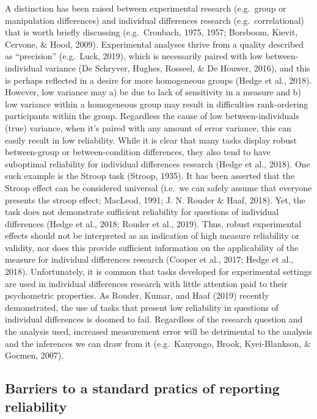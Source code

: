 \documentclass[english,,man,floatsintext]{apa6}
\begin{document}
A distinction has been raised between experimental research (e.g.~group or manipulation differences) and individual differences research (e.g.~correlational) that is worth briefly discussing (e.g.~Cronbach, 1975, 1957; Borsboom, Kievit, Cervone, \& Hood, 2009). Experimental analyses thrive from a quality described as \enquote{precision} (e.g.~Luck, 2019), which is necessarily paired with low between-individual variance (De Schryver, Hughes, Rosseel, \& De Houwer, 2016), and this is perhaps reflected in a desire for more homogeneous groups (Hedge et al., 2018). However, low variance may a) be due to lack of sensitivity in a measure and b) low variance within a homogeneous group may result in difficulties rank-ordering participants within the group. Regardless the cause of low between-individuals (true) variance, when it's paired with any amount of error variance, this can easily result in low reliability. While it is clear that many tasks display robust between-group or between-condition differences, they also tend to have suboptimal reliability for individual differences research (Hedge et al., 2018). One such example is the Stroop task (Stroop, 1935). It has been asserted that the Stroop effect can be considered universal (i.e.~we can safely assume that everyone presents the stroop effect; MacLeod, 1991; J. N. Rouder \& Haaf, 2018). Yet, the task does not demonstrate sufficient reliability for questions of individual differences (Hedge et al., 2018; Rouder et al., 2019). Thus, robust experimental effects should not be interpreted as an indication of high measure reliability or validity, nor does this provide sufficient information on the applicability of the measure for individual differences research (Cooper et al., 2017; Hedge et al., 2018). Unfortunately, it is common that tasks developed for experimental settings are used in individual differences research with little attention paid to their psychometric properties. As Rouder, Kumar, and Haaf (2019) recently demonstrated, the use of tasks that present low reliability in questions of individual differences is doomed to fail. Regardless of the research question and the analysis used, increased measurement error will be detrimental to the analysis and the inferences we can draw from it (e.g.~Kanyongo, Brook, Kyei-Blankson, \& Gocmen, 2007).

\hypertarget{barriers-to-a-standard-pratics-of-reporting-reliability}{%
\subsection{Barriers to a standard pratics of reporting reliability}\label{barriers-to-a-standard-pratics-of-reporting-reliability}}
\end{document}
